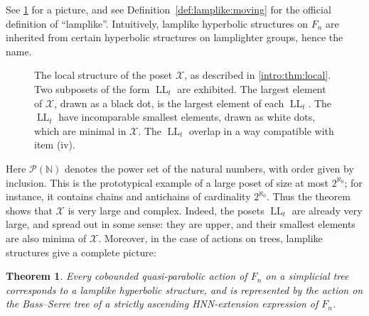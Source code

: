 \documentclass[reqno,12pt]{amsart}\setcounter{tocdepth}{1}
\newtheorem{thmA}{Theorem}
\theoremstyle{definition}
\newcommand{\N}{\mathbb{N}}
\DeclareMathOperator{\LL}{LL}
\newcommand{\X}{\mathcal{X}}
\numberwithin{equation}{section}
\begin{document}
See \cref{intro:fig:local} for a picture, and see Definition~\ref{def:lamplike:moving} for the official definition of ``lamplike''. Intuitively, lamplike hyperbolic structures on $F_n$ are inherited from certain hyperbolic structures on lamplighter groups, hence the name.

\begin{figure}[htb]
\centering
{}
\caption{The local structure of the poset $\X$, as described in \cref{intro:thm:local}. Two subposets of the form $\LL_t$ are exhibited. The largest element of $\X$, drawn as a black dot, is the largest element of each $\LL_t$. The $\LL_t$ have incomparable smallest elements, drawn as white dots, which are minimal in $\X$. The $\LL_t$ overlap in a way compatible with item (iv).}
\label{intro:fig:local}
\end{figure}

Here $\mathcal{P}(\N)$ denotes the power set of the natural numbers, with order given by inclusion. This is the prototypical example of a large poset of size at most $2^{\aleph_0}$; for instance, it contains chains and antichains of cardinality $2^{\aleph_0}$. Thus the theorem shows that $\X$ is very large and complex. Indeed, the posets $\LL_t$ are already very large, and spread out in some sense: they are upper, and their smallest elements are also minima of $\X$. Moreover, in the case of actions on trees, lamplike structures give a complete picture:

\begin{thmA}
\label{intro:thm:trees}
    Every cobounded quasi-parabolic action of $F_n$ on a simplicial tree corresponds to a lamplike hyperbolic structure, and is represented by the action on the Bass--Serre tree of a strictly ascending HNN-extension expression of $F_n$.
\end{thmA}
\end{document}

